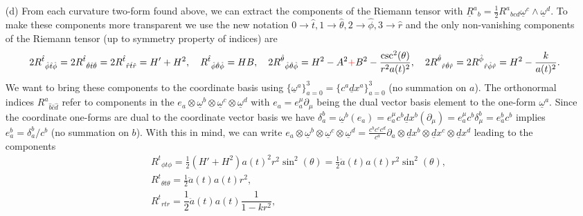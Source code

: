 \documentclass[10pt, a4paper]{article}
\begin{document}
{\begin{enumerate}
\begin{align*}
  \end{align*}
  \newpage
  \item[(d)] From each curvature two-form found above, we can extract the components of the Riemann tensor with $\underline{R}^{a}{ }_{b}=\frac{1}{2} R^{a}{ }_{bcd} \underline{\omega}^{c} \wedge \underline{\omega}^{d}$. To make these components more transparent we use the new notation $0 \to \hat{t}, 1 \to \hat{\theta}, 2 \to \hat{\phi}, 3 \to \hat{r}$ and the only non-vanishing components of the Riemann tensor (up to symmetry property of indices) are 
  \begin{align*}
    2R^{\hat{t}}{}_{\hat{\phi} \hat{t} \hat{\phi}} =  2R^{\hat{t}}{}_{\hat{\theta} \hat{t} \hat{\theta}} = 2R^{\hat{t}}{}_{\hat{r} \hat{t} \hat{r}} = H' + H^2, \quad R^{\hat{t}}{}_{\hat{\phi} \hat{\theta} \hat{\phi}} = HB, \quad  2R^{\hat{\theta}}{}_{\hat{\phi} \hat{\theta} \hat{\phi}} = H^2-A^2 \textcolor{red}{+}B^2 -\frac{\csc^2(\theta)}{r^2 a(t)^2},\quad  2R^{\hat{\theta}}{}_{\hat{r} \hat{\theta}\hat{r}} = 2R^{\hat{\phi}}{}_{\hat{r} \hat{\phi}\hat{r}} = H^2-\frac{k}{a(t)^2}.
  \end{align*}
  We want to bring these components to the coordinate basis using $\{\underline{\omega}^a\}_{a=0}^{3} = \{c^a \underline{d}x^a\}_{a=0}^{3}$ (no summation on $a$). The orthonormal indices $R^{\hat{a}}{}_{\hat{b} \hat{c} \hat{d}}$ refer to components in the $e_{a} \otimes \underline{\omega}^b \otimes \underline{\omega}^c \otimes \underline{\omega}^d$ with $e_{a} = e_a^\mu \partial_\mu$ being the dual vector basis element to the one-form $\underline{\omega}^{a}$. Since the coordinate one-forms are dual to the coordinate vector basis we have $\delta_{a}^b = \underline{\omega}^b (e_{a}) = e_a^\mu c^b \underline{d}x^b(\partial_\mu) = e_a^\mu c^b \delta_{\mu}^b = e_a^b c^b$ implies $e_a^b = \delta_a^b/c^b$ (no summation on $b$). With this in mind, we can write $e_{a} \otimes \underline{\omega}^b \otimes \underline{\omega}^c \otimes \underline{\omega}^d = \frac{c^b c^c c^d}{c^a} \partial_{a} \otimes \underline{d}x^b \otimes \underline{d}x^c \otimes \underline{d}x^d$ leading to the components 
  \begin{align*}
    &R^{t}{}_{\phi t \phi} = \frac{1}{2}(H' + H^2) a(t)^2 r^2 \sin^2(\theta) = \frac{1}{2}\ddot{a}(t) a(t) r^2 \sin^2(\theta), \\
    &R^{t}{}_{\theta t \theta} = \frac{1}{2}\ddot{a}(t) a(t) r^2, \\
    &R^{t}{}_{r t r} = \dfrac{1}{2}\ddot{a}(t) a(t)  \dfrac{1}{1-kr^2}, \\

\end{align*}
\end{enumerate}}
\end{document}
